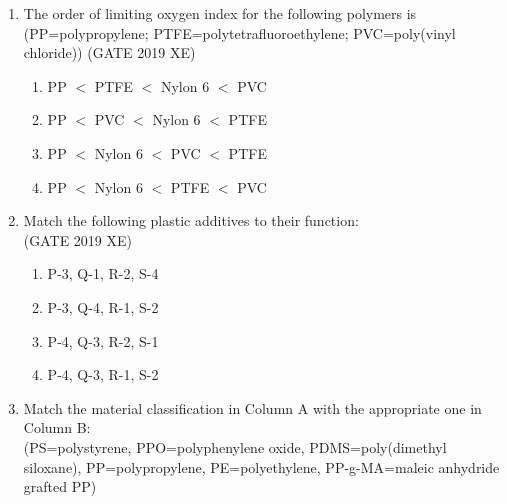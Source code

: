 \documentclass[journal,12pt,onecolumn]{IEEEtran}
\begin{document}
\begin{enumerate}


\hfill{(GATE 2019 XE)} \\
\begin{multicols}{2}
\begin{enumerate}
\item P-3, Q-2, R-1, S-4
\item P-3, Q-4, R-2, S-1
\item P-4, Q-3, R-1, S-2
\item P-2, Q-3, R-1, S-4
\end{enumerate}
\end{multicols}

\item The order of limiting oxygen index for the following polymers is (PP=polypropylene; PTFE=polytetrafluoroethylene; PVC=poly(vinyl chloride))
\hfill{(GATE 2019 XE)} \\
\begin{multicols}{2}
\begin{enumerate}
\item PP $<$ PTFE $<$ Nylon 6 $<$ PVC
\item PP $<$ PVC $<$ Nylon 6 $<$ PTFE
\item PP $<$ Nylon 6 $<$ PVC $<$ PTFE
\item PP $<$ Nylon 6 $<$ PTFE $<$ PVC
\end{enumerate}
\end{multicols}

\item Match the following plastic additives to their function:\\



\hfill{(GATE 2019 XE)} \\
\begin{multicols}{2}
\begin{enumerate}
\item P-3, Q-1, R-2, S-4
\item P-3, Q-4, R-1, S-2
\item P-4, Q-3, R-2, S-1
\item P-4, Q-3, R-1, S-2
\end{enumerate}
\end{multicols}

\newpage

\item Match the material classification in Column A with the appropriate one in Column B:\\
(PS=polystyrene, PPO=polyphenylene oxide, PDMS=poly(dimethyl siloxane), PP=polypropylene, PE=polyethylene, PP-g-MA=maleic anhydride grafted PP)\\


\end{enumerate}
\end{document}
